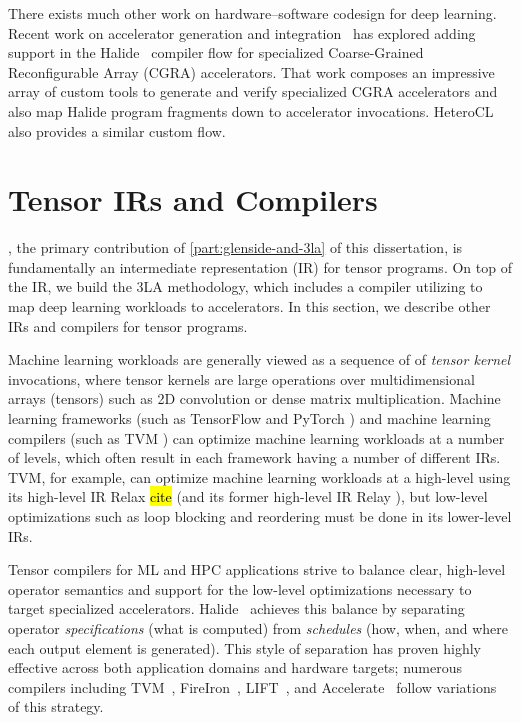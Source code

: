 There exists much other work on
  hardware--software codesign
  for deep learning.
Recent work on accelerator generation and integration~\cite{
    bahr2020creating, truong2020fault}
  has explored adding support in the Halide~\cite{ragan2013halide}
  compiler flow for specialized Coarse-Grained Reconfigurable Array (CGRA) accelerators.
That work composes an
  impressive array of custom tools to
  generate and verify specialized CGRA accelerators
  and also map Halide program fragments
  down to accelerator invocations.
HeteroCL~\cite{lai2019heterocl} also provides
  a similar custom flow.


\section{Tensor IRs and Compilers}

\g, the primary contribution
  of \cref{part:glenside-and-3la}
  of this dissertation,
  is fundamentally an
  intermediate representation (IR)
  for tensor programs.
On top of the \g IR,
  we build the 3LA methodology,
  which includes a compiler
  utilizing \g
  to map deep learning workloads
  to accelerators.
In this section, we describe
  other IRs and compilers
  for tensor programs.

Machine learning workloads
 are generally viewed
 as a sequence of 
 of \textit{tensor kernel} invocations,
 where tensor kernels
 are large operations
 over multidimensional arrays (tensors)
 such as 2D convolution
 or dense matrix multiplication.
Machine learning frameworks
 (such as TensorFlow \cite{tensorflow}
   and PyTorch \cite{pytorch})
 and machine learning compilers
 (such as TVM \cite{chen2018tvm})
 can optimize
 machine learning workloads
 at a number of levels,
 which often result
 in each framework
 having a number of different IRs.
TVM, for example,
 can optimize machine learning workloads
 at a high-level
 using its high-level IR
 Relax \hl{cite}
 (and its former high-level
   IR Relay \cite{relay}),
 but
 low-level optimizations
 such as loop blocking and reordering
 must be done 
 in its lower-level IRs.


Tensor compilers for ML and HPC applications strive
  to balance clear, high-level operator semantics
  and support for the low-level optimizations
  necessary to target specialized accelerators.
Halide~\cite{halide}
  achieves this balance by separating
  operator \textit{specifications} (what is computed) from
  \textit{schedules} (how, when, and where
  each output element is generated).
This style of separation has proven
  highly effective across both
  application domains and hardware targets;
  numerous compilers including TVM~\cite{chen2018tvm},
  FireIron~\cite{hagedorn2020fireiron},
  LIFT~\cite{lift}, and Accelerate~\cite{accelerate}
  follow variations of this strategy.
  
